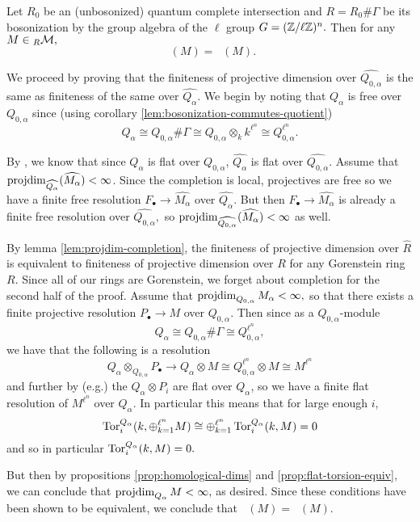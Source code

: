 \documentclass [11pt, proquest] {uwthesis}[2020/02/24]
\DeclareMathOperator{\supphR}{supp^\mathit{hyp}_R}
\DeclareMathOperator{\supphRnaught}{supp^\mathit{hyp}_{R_0}}
\begin{document}
    \begin{thm}\label{lem:hyp-support-bosonization}
        Let $R_0$ be an (unbosonized) quantum complete intersection and $R=R_0\#\Gamma$ be its bosonization by the group algebra of the $\ell$ group $G=(\mathbb{Z}/\ell\mathbb{Z})^n.$ Then for any $M\in{_R\mathcal{M}},$
        \[\supphR(M)=\supphRnaught(M).\]
    \end{thm}
    \begin{prf}
        We proceed by proving that the finiteness of projective dimension over $\widehat{Q_{0,\alpha}}$ is the same as finiteness of the same over $\widehat{Q_\alpha}.$ We begin by noting that $Q_\alpha$ is free over $Q_{0,\alpha}$ since (using corollary \ref{lem:bosonization-commutes-quotient})
        \[Q_\alpha\cong Q_{0,\alpha}\# \Gamma\cong Q_{0,\alpha}\otimes_k k^{\ell^n}\cong Q_{0,\alpha}^{\ell^n}.\]
        
        By \cite[\href{https://stacks.math.columbia.edu/tag/0C4G}{Tag 0C4G}]{stacks-project}, we know that since $Q_\alpha$ is flat over $Q_{0,\alpha}$, $\widehat{Q_\alpha}$ is flat over $\widehat{Q_{0,\alpha}}.$ Assume that $\operatorname{projdim}_{\widehat{Q_\alpha}}(\widehat{M_\alpha})<\infty$. Since the completion is local, projectives are free so we have a finite free resolution $F_\bullet\to \widehat{M_\alpha}$ over $\widehat{Q_\alpha}.$ But then $F_\bullet\to \widehat{M_\alpha}$ is already a finite free resolution over $\widehat{Q_{0,\alpha}},$ so $\operatorname{projdim}_{\widehat{Q_{0,\alpha}}}(\widehat{M_\alpha})<\infty$ as well.
        
        By lemma \ref{lem:projdim-completion}, the finiteness of projective dimension over $\widehat R$ is equivalent to finiteness of projective dimension over $R$ for any Gorenstein ring $R$. Since all of our rings are Gorenstein, we forget about completion for the second half of the proof. Assume that $\operatorname{projdim}_{Q_{0,\alpha}}M_\alpha<\infty,$ so that there exists a finite projective resolution $P_\bullet\to M$ over $Q_{0,\alpha}.$ Then since as a $Q_{0,\alpha}$-module
        \[Q_\alpha\cong Q_{0,\alpha}\#\Gamma\cong Q_{0,\alpha}^{\ell^n},\]
        we have that the following is a resolution 
        \[Q_\alpha\otimes_{Q_{0,\alpha}}P_\bullet\to Q_\alpha\otimes M\cong Q_{0,\alpha}^{\ell^n}\otimes M\cong M^{\ell^n}\]
        and further by (e.g.) \cite[\href{https://stacks.math.columbia.edu/tag/00HI}{Tag 00HI}]{stacks-project} the $Q_\alpha\otimes P_i$ are flat over $Q_\alpha$, so we have a finite flat resolution of $M^{\ell^n}$ over $Q_\alpha.$ In particular this means that for large enough $i$,
        \[\operatorname{Tor}^{Q_\alpha}_i(k,\oplus_{k=1}^{\ell^n}M)\cong \oplus_{k=1}^{\ell^n}\operatorname{Tor}^{Q_\alpha}_i(k,M)=0\]
        and so in particular $\operatorname{Tor}^{Q_\alpha}_i(k,M)=0.$ 
        
        But then by propositions \ref{prop:homological-dims} and \ref{prop:flat-torsion-equiv}, we can conclude that $\operatorname{projdim}_{Q_\alpha}M<\infty,$ as desired.  Since these conditions have been shown to be equivalent, we conclude that $\supphR(M)=\supphRnaught(M).$
    \end{prf}
    
\end{document}
